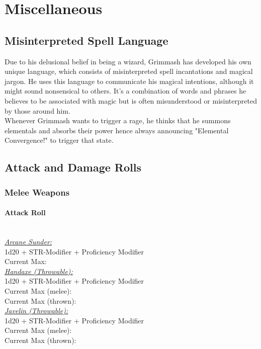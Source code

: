 \documentclass[letterpaper,openany,oneside,twocolumn]{book}
\begin{document}
\section*{Miscellaneous}
\subsection*{Misinterpreted Spell Language}
Due to his delusional belief in being a wizard, Grimmash has developed his own unique language, which consists of misinterpreted spell incantations and magical jargon. He uses this language to communicate his magical intentions, although it might sound nonsensical to others. It's a combination of words and phrases he believes to be associated with magic but is often misunderstood or misinterpreted by those around him.\\
Whenever Grimmash wants to trigger a rage, he thinks that he summons elementals and absorbs their power hence always announcing "Elemental Convergence!" to trigger that state.

\subsection*{Attack and Damage Rolls}
\subsubsection*{Melee Weapons}
\paragraph*{Attack Roll}\hfill\\
\underline{\textit{Arcane Sunder:}}\\
1d20 + STR-Modifier + Proficiency Modifier\\
\indent Current Max: \\
\underline{\textit{Handaxe (Throwable):}}\\
1d20 + STR-Modifier + Proficiency Modifier\\
\indent Current Max (melee): \\
\indent Current Max (thrown): \\
\underline{\textit{Javelin (Throwable):}}\\
1d20 + STR-Modifier + Proficiency Modifier\\
\indent Current Max (melee): \\
\indent Current Max (thrown): 
\end{document}

